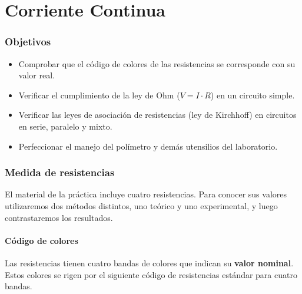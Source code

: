 \documentclass[12pt, a4paper, titlepage]{article}
\begin{document}
  \newpage
  \part{Corriente Continua}

  \section{Objetivos}
  \begin{itemize}[label=$-$]
    \item Comprobar que el código de colores de las resistencias se corresponde con su valor real.
    \item Verificar el cumplimiento de la ley de Ohm ($V = I\cdot R$) en un circuito simple.
    \item Verificar las leyes de asociación de resistencias (ley de Kirchhoff) en circuitos en serie, paralelo y mixto.
    \item Perfeccionar el manejo del polímetro y demás utensilios del laboratorio.
  \end{itemize}

  \section{Medida de resistencias}
  El material de la práctica incluye cuatro resistencias. Para conocer sus valores utilizaremos dos métodos distintos, uno teórico y uno experimental, y luego contrastaremos los resultados.

  \subsection{Código de colores}
  Las resistencias tienen cuatro bandas de colores que indican su \textbf{valor nominal}. Estos colores se rigen por el siguiente código de resistencias estándar para cuatro bandas.
\end{document}
